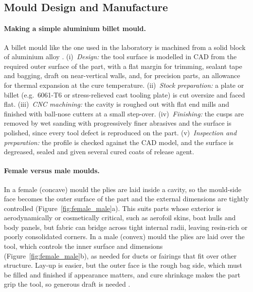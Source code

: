 \documentclass[11pt,a4paper]{article}
\newenvironment{addedblock}{\color{addgreen}}{}
\newenvironment{addedblock}{}{}
\begin{document}
\begin{addedblock}
\subsection{Mould Design and Manufacture}
\label{sec:moulds}

\paragraph{Making a simple aluminium billet mould.}
A billet mould like the one used in the laboratory is machined from a
solid block of aluminium alloy \citep{campbell2004}. (i)~\emph{Design:}
the tool surface is modelled in CAD from the required outer surface of
the part, with a flat margin for trimming, sealant tape and bagging,
draft on near-vertical walls, and, for precision parts, an allowance
for thermal expansion at the cure temperature. (ii)~\emph{Stock
preparation:} a plate or billet (e.g.\ 6061-T6 or stress-relieved cast
tooling plate) is cut oversize and faced flat. (iii)~\emph{CNC
machining:} the cavity is roughed out with flat end mills and finished
with ball-nose cutters at a small step-over. (iv)~\emph{Finishing:}
the cusps are removed by wet sanding with progressively finer
abrasives and the surface is polished, since every tool defect is
reproduced on the part. (v)~\emph{Inspection and preparation:} the
profile is checked against the CAD model, and the surface is degreased,
sealed and given several cured coats of release agent.

\paragraph{Female versus male moulds.}
In a female (concave) mould the plies are laid inside a cavity, so the
mould-side face becomes the outer surface of the part and the external
dimensions are tightly controlled (Figure~\ref{fig:female_male}a).
This suits parts whose exterior is aerodynamically or cosmetically
critical, such as aerofoil skins, boat hulls and body panels, but
fabric can bridge across tight internal radii, leaving resin-rich or
poorly consolidated corners. In a male (convex) mould the plies are
laid over the tool, which controls the inner surface and dimensions
(Figure~\ref{fig:female_male}b), as needed for ducts or fairings that
fit over other structure. Lay-up is easier, but the outer face is the
rough bag side, which must be filled and finished if appearance
matters, and cure shrinkage makes the part grip the tool, so generous
draft is needed \citep{campbell2004,astrom1997}.
\end{addedblock}
\end{document}
